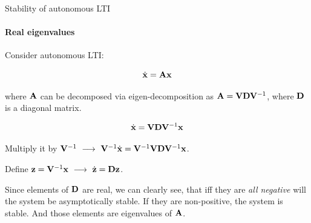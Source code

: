\documentclass{beamer}
\begin{document}
\begin{frame}{Stability of autonomous LTI}
\framesubtitle{Real eigenvalues}
\begin{flushleft}

Consider autonomous LTI:

\begin{equation}
    \dot{\mathbf{x}} = \mathbf{A} \mathbf{x}
\end{equation}

where $\mathbf{A}$ can be decomposed via eigen-decomposition as $\mathbf{A} = \mathbf{V} \mathbf{D} \mathbf{V}^{-1}$, where $\mathbf{D}$ is a diagonal matrix. 

\bigskip

\begin{equation}
    \dot{\mathbf{x}} = \mathbf{V} \mathbf{D} \mathbf{V}^{-1} \mathbf{x}
\end{equation}

Multiply it by $\bo{V}^{-1} 
\ \longrightarrow \ 
\bo{V}^{-1} \dot{\bo{x}} = \bo{V}^{-1} \bo{V} \bo{D} \bo{V}^{-1} \bo{x}$.

Define $\mathbf{z} = \mathbf{V}^{-1} \mathbf{x} 
\ \longrightarrow \
\dot{\mathbf{z}} = \mathbf{D} \mathbf{z}$.

\bigskip

Since elements of $\mathbf{D}$ are real, we can clearly see, that iff they are \emph{all negative} will the system be asymptotically stable. If they are non-positive, the system is stable. And those elements are eigenvalues of $\mathbf{A}$.

\end{flushleft}
\end{frame}
\end{document}
